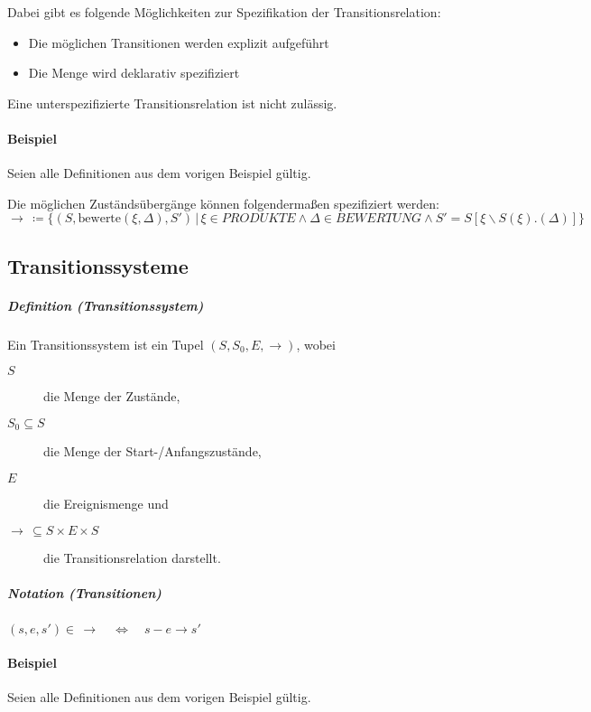 \documentclass[a4paper, 11pt, accentcolor = tud3b]{tudreport}
\newcommand{\forwhich}{\ensuremath{{\,\vert\,}}}
\newcommand{\definition}[2]{\subparagraph{Definition (#1)} #2}
\newcommand{\notation}[2]{\subparagraph{Notation (#1)} #2}
\begin{document}
			    Dabei gibt es folgende Möglichkeiten zur Spezifikation der Transitionsrelation:
			    \begin{itemize}
				    \item Die möglichen Transitionen werden explizit aufgeführt
				    \item Die Menge wird deklarativ spezifiziert
			    \end{itemize}
			    Eine unterspezifizierte Transitionsrelation ist nicht zulässig.
			    
			    \paragraph{Beispiel}
				    Seien alle Definitionen aus dem vorigen Beispiel gültig.
				    
				    Die möglichen Zuständsübergänge können folgendermaßen spezifiziert werden:
				    \begin{equation*}
					    \rightarrow\, \coloneqq \{ (S, \text{bewerte}(\xi, \Delta), S') \forwhich \xi \in \textit{PRODUKTE} \land \Delta \in \textit{BEWERTUNG} \land S' = S[\xi \backslash S(\xi).(\Delta)] \}
				    \end{equation*}
		    
		    \subsection{Transitionssysteme}
			    \definition{Transitionssystem}{
			    	Ein Transitionssystem ist ein Tupel $ (S, S _ 0, E, \rightarrow) $, wobei
			    	\begin{description}
			    		\item[$ S $] die Menge der Zustände,
			    		\item[$ S _ 0 \subseteq S $] die Menge der Start-/Anfangszustände,
			    		\item[$ E $] die Ereignismenge und
			    		\item[$ \rightarrow\, \subseteq S \times E \times S $] die Transitionsrelation darstellt.
			    	\end{description}
			    }
			    
			    \notation{Transitionen}{$ (s, e, s') \in \,\rightarrow \quad\iff\quad s - e \rightarrow s' $}
		    
			    \paragraph{Beispiel}
				    Seien alle Definitionen aus dem vorigen Beispiel gültig.
				    
\end{document}

